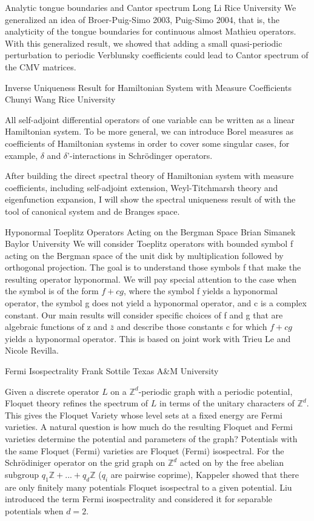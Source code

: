 \begin{addmargin}[2em]{0em}
\vspace{1.5ex}
\abs
{Analytic tongue boundaries and Cantor spectrum}
{Long Li}
{Rice University}
{We generalized an idea of Broer-Puig-Simo 2003, Puig-Simo 2004, that is, the analyticity of the tongue boundaries for continuous almost Mathieu operators. With this generalized result, we showed that adding a small quasi-periodic perturbation to periodic Verblunsky coefficients could lead to Cantor spectrum of the CMV matrices.}


\vspace{1.5ex}
\abs
{Inverse Uniqueness Result for Hamiltonian System with Measure Coefficients}
{Chunyi Wang}
{Rice University}
{All self-adjoint differential operators of one variable can be written as a linear Hamiltonian system. To be more general, we can introduce Borel measures as coefficients of Hamiltonian systems in order to cover some singular cases, for example, $\delta$ and $\delta’$-interactions in Schr\"odinger operators.

After building the direct spectral theory of Hamiltonian system with measure coefficients, including self-adjoint extension, Weyl-Titchmarsh theory and eigenfunction expansion, I will show the spectral uniqueness result of with the tool of canonical system and de Branges space.}


\vspace{1.5ex}
\abs
{Hyponormal Toeplitz Operators Acting on the Bergman Space}
{Brian Simanek}
{Baylor University}
{We will consider Toeplitz operators with bounded symbol f acting on the Bergman space of the unit disk by multiplication followed by orthogonal projection.  The goal is to understand those symbols f that make the resulting operator hyponormal.  We will pay special attention to the case when the symbol is of the form $f+cg$, where the symbol f yields a hyponormal operator, the symbol g does not yield a hyponormal operator, and c is a complex constant.  Our main results will consider specific choices of f and g that are algebraic functions of z and $\bar{z}$ and describe those constants c for which $f+cg$ yields a hyponormal operator.  This is based on joint work with Trieu Le and Nicole Revilla.}


\vspace{1.5ex}
\abs
{Fermi Isospectrality}
{Frank Sottile}
{Texas A\&M University}
{Given a discrete operator $L$ on a $\mathbb{Z}^d$-periodic graph with a periodic potential,
Floquet theory refines the spectrum of $L$ in terms of the unitary characters of
$\mathbb{Z}^d$.  This gives the Floquet Variety whose level sets at a fixed energy are Fermi
varieties.  A natural question is how much do the resulting Floquet and Fermi
varieties determine the potential and parameters of the graph? Potentials with
the same Floquet (Fermi) varieties are Floquet (Fermi) isospectral.  For the
Schr\"odiniger operator on the grid graph on $\mathbb{Z}^d$ acted on by the free abelian
subgroup $q_1\mathbb{Z} + ... + q_d \mathbb{Z}$ ($q_i$ are pairwise coprime), Kappeler showed that
there are only finitely many potentials Floquet isospectral to a given
potential.  Liu introduced the term Fermi isospectrality and considered it for
separable potentials when $d=2$.

}
\end{addmargin}
